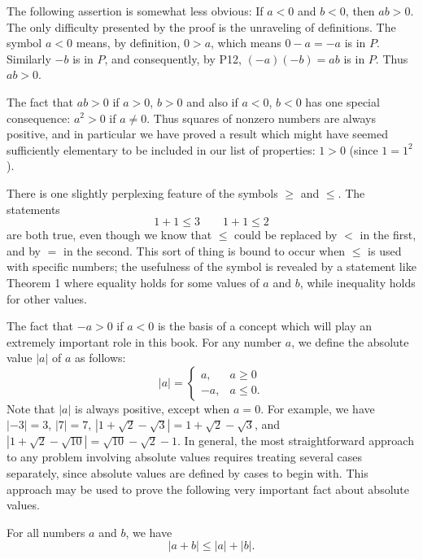 The following assertion is somewhat less obvious: If $a<0$ and $b<0$, then
$ab>0$. The only difficulty presented by the proof is the unraveling of
definitions. The symbol $a<0$ means, by definition, $0>a$, which means
$0-a=-a$ is in $P$. Similarly $-b$ is in $P$, and consequently, by P12,
$(-a)(-b)=ab$ is in $P$. Thus $ab>0$.

The fact that $ab>0$ if $a>0$, $b>0$ and also if $a<0$, $b<0$ has one special
consequence: $a^2>0$ if $a\neq 0$. Thus squares of nonzero numbers are always
positive, and in particular we have proved a result which might have seemed
sufficiently elementary to be included in our list of properties: $1>0$ (since
$1=1^2$).

There is one slightly perplexing feature of the symbols $\geq$ and $\leq$.
The statements
\[ 1+1 \leq 3 \qquad 1+1 \leq 2 \]
are both true, even though we know that $\leq$ could be replaced by $<$ in
the first, and by $=$ in the second. This sort of thing is bound to occur
when $\leq$ is used with specific numbers; the usefulness of the symbol is
revealed by a statement like Theorem 1 where equality holds for some values
of $a$ and $b$, while inequality holds for other values.

The fact that $-a>0$ if $a<0$ is the basis of a concept which will play an
extremely important role in this book. For any number $a$, we define the
absolute value $|a|$ of $a$ as follows:
\[
|a| =
\begin{cases}
a, & a \geq 0\\
-a, & a \leq 0.
\end{cases}
\]
Note that $|a|$ is always positive, except when $a=0$. For example, we have
$|-3|=3$, $|7|=7$, $|1+\sqrt{2}-\sqrt{3}| = 1+\sqrt{2}-\sqrt{3}$, and
$|1+\sqrt{2}-\sqrt{10}| = \sqrt{10}-\sqrt{2}-1$. In general, the most
straightforward approach to any problem involving absolute values requires
treating several cases separately, since absolute values are defined by cases
to begin with. This approach may be used to prove the following very
important fact about absolute values.

\begin{theorem}
For all numbers $a$ and $b$, we have
\[ |a+b| \leq |a| + |b|. \]
\end{theorem}

